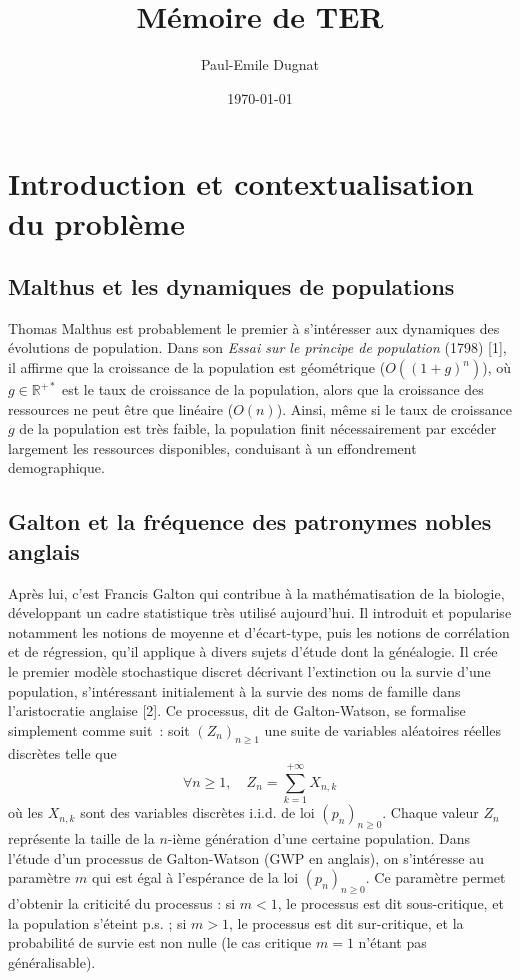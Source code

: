 \documentclass[12pt,a4paper]{article}
\title{Mémoire de TER}
\author{Paul-Emile Dugnat}
\date{\today}
\begin{document}
\newpage
\tableofcontents
\newpage
\doublespacing

\section{Introduction et contextualisation du problème}

\subsection{Malthus et les dynamiques de populations}
Thomas Malthus est probablement le premier à s'intéresser aux dynamiques des évolutions de population. Dans son \textit{Essai sur le principe de population} (1798) [1], il affirme que la croissance de la population est géométrique ($O((1+g)^n)$), où $g \in \mathbb{R}^{+*}$ est le taux de croissance de la population, alors que la croissance des ressources ne peut être que linéaire ($O(n)$). Ainsi, même si le taux de croissance $g$ de la population est très faible, la population finit nécessairement par excéder largement les ressources disponibles, conduisant à un effondrement demographique.\par 

\subsection{Galton et la fréquence des patronymes nobles anglais}
Après lui, c’est Francis Galton qui contribue à la mathématisation de la biologie, développant un cadre statistique très utilisé aujourd’hui. Il introduit et popularise notamment les notions de moyenne et d’écart-type, puis les notions de corrélation et de régression, qu’il applique à divers sujets d’étude dont la généalogie. Il crée le premier modèle stochastique discret décrivant l’extinction ou la survie d’une population, s’intéressant initialement à la survie des noms de famille dans l’aristocratie anglaise [2]. 
Ce processus, dit de Galton-Watson, se formalise simplement comme suit : soit $(Z_n)_{n\geq1}$ une suite de variables aléatoires réelles discrètes telle que $$ \forall n \geq 1, \quad Z_n = \sum_{k=1}^{+\infty} X_{n,k}$$ où les $X_{n,k}$ sont des variables discrètes i.i.d. de loi $(p_n)_{n\geq0}$. 
Chaque valeur $Z_n$ représente la taille de la $n$-ième génération d'une certaine population. Dans l'étude d'un processus de Galton-Watson (GWP en anglais), on s'intéresse au paramètre $m$ qui est égal à l'espérance de la loi $(p_n)_{n \geq 0}$. Ce paramètre permet d'obtenir la criticité du processus : si $m<1$, le processus est dit sous-critique, et la population s'éteint p.s. ; si $m>1$, le processus est dit sur-critique, et la probabilité de survie est non nulle (le cas critique $m=1$ n'étant pas généralisable). \par
\end{document}
